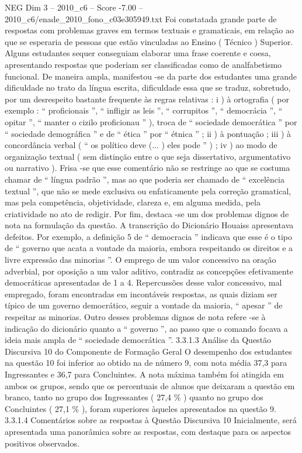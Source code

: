 \begin{textsample}{NEG Dim 3 – 2010\_c6 – Score -7.00 – 2010\_c6/enade\_2010\_fono\_c03e305949.txt}
Foi constatada grande parte de respostas com problemas graves em termos textuais e gramaticais, em relação ao que se esperaria de pessoas que estão vinculadas ao Ensino ( Técnico ) Superior.
Alguns estudantes sequer conseguiam elaborar uma frase coerente e coesa, apresentando respostas que poderiam ser classificadas como de analfabetismo funcional.
De maneira ampla, manifestou -se da parte dos estudantes uma grande dificuldade no trato da língua escrita, dificuldade essa que se traduz, sobretudo, por um desrespeito bastante frequente às regras relativas : i ) à ortografia ( por exemplo : “ proficionais ”, “ infligir as leis ”, “ corrupitos ”, “ democrácia ”, “ opitar ”, “ manter o cizilo proficionau ” ), troca de “ sociedade democrática ” por “ sociedade demográfica ” e de “ ética ” por “ étnica ” ; ii ) à pontuação ; iii ) à concordância verbal ( “ os político deve (... ) eles pode ” ) ; iv ) ao modo de organização textual ( sem distinção entre o que seja dissertativo, argumentativo ou narrativo ).
Frisa -se que esse comentário não se restringe ao que se costuma chamar de “ língua padrão ”, mas ao que poderia ser chamado de “ excelência textual ”, que não se mede exclusiva ou enfaticamente pela correção gramatical, mas pela competência, objetividade, clareza e, em alguma medida, pela criatividade no ato de redigir.
Por fim, destaca -se um dos problemas dignos de nota na formulação da questão.
A transcrição do Dicionário Houaiss apresentava defeitos.
Por exemplo, a definição 5 de “ democracia ” indicava que esse é o tipo de “ governo que acata a vontade da maioria, embora respeitando os direitos e a livre expressão das minorias ”.
O emprego de um valor concessivo na oração adverbial, por oposição a um valor aditivo, contradiz as concepções efetivamente democráticas apresentadas de 1 a 4.
Repercussões desse valor concessivo, mal empregado, foram encontradas em incontáveis respostas, as quais diziam ser típico de um governo democrático, seguir a vontade da maioria, “ apesar ” de respeitar as minorias.
Outro desses problemas dignos de nota refere -se à indicação do dicionário quanto a “ governo ”, ao passo que o comando focava a ideia mais ampla de “ sociedade democrática ”. 3.3.1.3 Análise da Questão Discursiva 10 do Componente de Formação Geral O desempenho dos estudantes na questão 10 foi inferior ao obtido na de número 9, com nota média 37,3 para Ingressantes e 36,7 para Concluintes.
A nota máxima também foi atingida em ambos os grupos, sendo que os percentuais de alunos que deixaram a questão em branco, tanto no grupo dos Ingressantes ( 27,4 \% ) quanto no grupo dos Concluintes ( 27,1 \% ), foram superiores àqueles apresentados na questão 9. 3.3.1.4 Comentários sobre as respostas à Questão Discursiva 10 Inicialmente, será apresentada uma panorâmica sobre as respostas, com destaque para os aspectos positivos observados.

\end{textsample}

